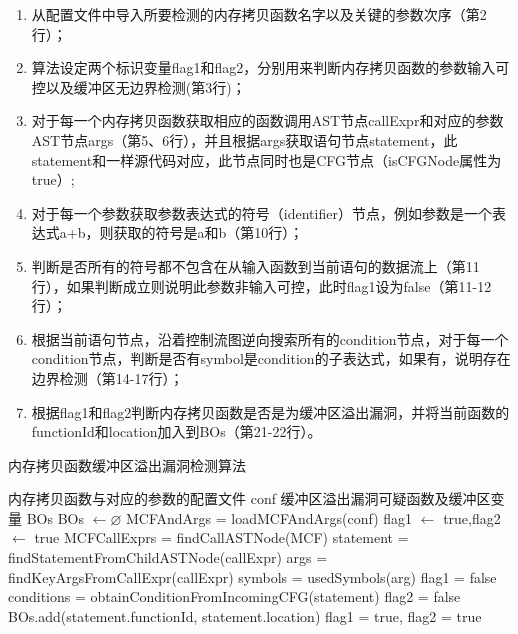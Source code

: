 {%
\begin{enumerate}[(1)]
\item 
从配置文件中导入所要检测的内存拷贝函数名字以及关键的参数次序（第2行）；
\item
算法设定两个标识变量flag1和flag2，分别用来判断内存拷贝函数的参数输入可控以及缓冲区无边界检测(第3行)；
\item
对于每一个内存拷贝函数获取相应的函数调用AST节点callExpr和对应的参数AST节点args（第5、6行），并且根据args获取语句节点statement，此statement和一样源代码对应，此节点同时也是CFG节点（isCFGNode属性为true）;
\item 
对于每一个参数获取参数表达式的符号（identifier）节点，例如参数是一个表达式a+b，则获取的符号是a和b（第10行）；
\item 
判断是否所有的符号都不包含在从输入函数到当前语句的数据流上（第11行），如果判断成立则说明此参数非输入可控，此时flag1设为false（第11-12行）；
\item 
根据当前语句节点，沿着控制流图逆向搜索所有的condition节点，对于每一个condition节点，判断是否有symbol是condition的子表达式，如果有，说明存在边界检测（第14-17行）；
\item 根据flag1和flag2判断内存拷贝函数是否是为缓冲区溢出漏洞，并将当前函数的functionId和location加入到BOs（第21-22行）。
\end{enumerate}

\begin{algorithm}
	\renewcommand{\algorithmicrequire}{\textbf{Input:}}
	\renewcommand{\algorithmicensure}{\textbf{Output:}}
	\caption{内存拷贝函数缓冲区溢出漏洞检测算法}
	\label{内存拷贝函数缓冲区溢出漏洞检测算法}
	\begin{algorithmic}[1]
		\REQUIRE 内存拷贝函数与对应的参数的配置文件 conf
		\ENSURE 缓冲区溢出漏洞可疑函数及缓冲区变量 BOs
		\STATE BOs $\leftarrow \varnothing$
		\STATE MCFAndArgs = loadMCFAndArgs(conf)
		\STATE flag1 $\leftarrow$ true,flag2 $\leftarrow$ true
			\STATE MCFCallExprs = findCallASTNode(MCF)
				\STATE statement = findStatementFromChildASTNode(callExpr)
				\STATE args = findKeyArgsFromCallExpr(callExpr)
					\STATE symbols = usedSymbols(arg)
						\STATE flag1 = false
					\ENDIF
					\STATE conditions = obtainConditionFromIncomingCFG(statement)
							\STATE flag2 = false
						\ENDIF
					\ENDFOR
				\ENDFOR
					\STATE BOs.add(statement.functionId, statement.location)
				\ENDIF
				\STATE flag1 = true, flag2 = true
			\ENDFOR
		\ENDFOR
		

\end{algorithmic}
\end{algorithm}}

